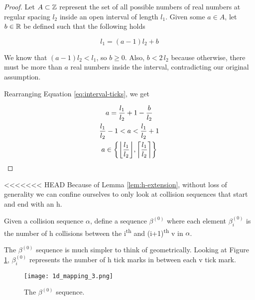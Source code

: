 \begin{proof}
	Let $A \subset \mathbb Z$ represent the set of all possible numbers of real numbers at regular spacing $l_2$ inside an open interval of length $l_1$. Given some $a \in A$, let $b \in \mathbb R$ be defined such that the following holds

	\begin{equation}\label{eq:interval-ticks}
		l_1 = (a - 1) l_2 + b
	\end{equation}

	We know that $(a - 1) l_2 < l_1$, so $b \ge 0$. Also, $b < 2 \, l_2$ because otherwise, there must be more than $a$ real numbers inside the interval, contradicting our original assumption.

	Rearranging Equation \ref{eq:interval-ticks}, we get

	\begin{gather}
		a = \frac{l_1}{l_2} + 1 - \frac{b}{l_2}\\
		\frac{l_1}{l_2} - 1 < a < \frac{l_1}{l_2} + 1\\
		a \in \cbracket{\floor{\frac{l_1}{l_2}}, \ceil{\frac{l_1}{l_2}}}
	\end{gather}
\end{proof}


<<<<<<< HEAD
Because of Lemma \ref{lem:h-extension}, without loss of generality we can confine ourselves to only look at collision sequences that start and end with an h.

\begin{definition}
	Given a collision sequence $\alpha$, define a sequence $\beta^{(0)}$ where each element $\beta^{(0)}_i$ is the number of h collisions between the i\textsuperscript{th} and (i+1)\textsuperscript{th} v in $\alpha$.
\end{definition}

The $\beta^{(0)}$ sequence is much simpler to think of geometrically. Looking at Figure \ref{fig:beta-sequence}, $\beta^{(0)}_i$ represents the number of h tick marks in between each v tick mark.

\begin{figure}[H]
  \begin{center}
    \texttt{[image: 1d\_mapping\_3.png]}
  \end{center}
  \vspace{-.2in} %
  \caption{\label{fig:beta-sequence} The $\beta^{(0)}$ sequence.}
\end{figure}

